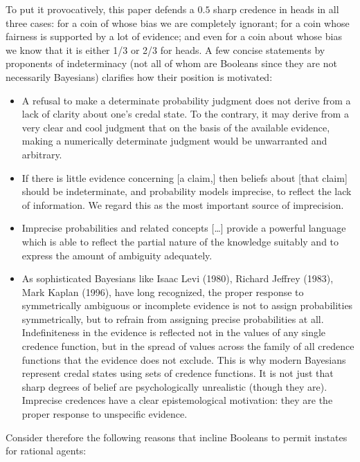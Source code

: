 \documentclass[11pt]{article}
\begin{document}
To put it provocatively, this paper defends a $0.5$ sharp credence in
heads in all three cases: for a coin of whose bias we are completely
ignorant; for a coin whose fairness is supported by a lot of evidence;
and even for a coin about whose bias we know that it is either 1/3 or
2/3 for heads. A few concise statements by proponents of indeterminacy
(not all of whom are Booleans since they are not necessarily
Bayesians) clarifies how their position is motivated:

\begin{itemize}
\item A refusal to make a determinate probability judgment does not
  derive from a lack of clarity about one's credal state. To the
  contrary, it may derive from a very clear and cool judgment that on
  the basis of the available evidence, making a numerically
  determinate judgment would be unwarranted and arbitrary.
\item If there is little evidence concerning [a claim,] then beliefs
  about [that claim] should be indeterminate, and probability models
  imprecise, to reflect the lack of information. We regard this as the
  most important source of imprecision. 
\item Imprecise probabilities and related concepts [{\ldots}] provide
  a powerful language which is able to reflect the partial nature of
  the knowledge suitably and to express the amount of ambiguity
  adequately. 
\item As sophisticated Bayesians like Isaac Levi (1980), Richard
  Jeffrey (1983), Mark Kaplan (1996), have long recognized, the proper
  response to symmetrically ambiguous or incomplete evidence is not to
  assign probabilities symmetrically, but to refrain from assigning
  precise probabilities at all. Indefiniteness in the evidence is
  reflected not in the values of any single credence function, but in
  the spread of values across the family of all credence functions
  that the evidence does not exclude. This is why modern Bayesians
  represent credal states using sets of credence functions. It is not
  just that sharp degrees of belief are psychologically unrealistic
  (though they are). Imprecise credences have a clear epistemological
  motivation: they are the proper response to unspecific evidence.
\end{itemize}

Consider therefore the following reasons that incline Booleans to
permit instates for rational agents:
\end{document}
